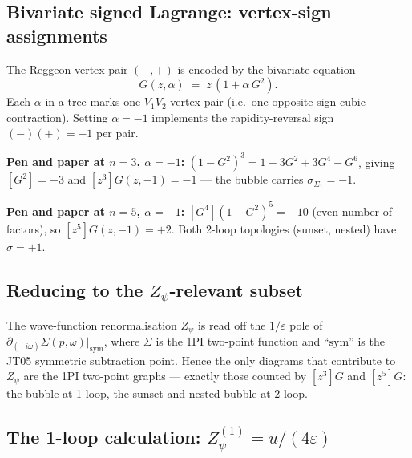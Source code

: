 \documentclass[11pt,a4paper]{article}
\theoremstyle{definition}
\theoremstyle{plain}
\begin{document}
\subsection{Bivariate signed Lagrange: vertex-sign assignments}
\label{app:bivariate-walk}

\begin{cfacbox}
The Reggeon vertex pair $(-,+)$ is encoded by the bivariate equation
\begin{equation}\label{eq:bivariate-walk}
  G(z, \alpha) \;=\; z\,(1 + \alpha\,G^2).
\end{equation}
Each $\alpha$ in a tree marks one $V_1 V_2$ vertex pair (i.e.\ one
opposite-sign cubic contraction).  Setting $\alpha = -1$ implements
the rapidity-reversal sign $(-)(+) = -1$ per pair.

\textbf{Pen and paper at $n = 3$, $\alpha = -1$:}
$(1 - G^2)^3 = 1 - 3 G^2 + 3 G^4 - G^6$,
giving $[G^2] = -3$ and $[z^3]G(z, -1) = -1$ --- the bubble carries
$\sigma_{\Sigma_1} = -1$.

\textbf{Pen and paper at $n = 5$, $\alpha = -1$:}
$[G^4](1 - G^2)^5 = +10$ (even number of factors), so $[z^5]G(z,-1) =
+2$.  Both 2-loop topologies (sunset, nested) have $\sigma = +1$.
\end{cfacbox}

\subsection{Reducing to the $Z_\psi$-relevant subset}\label{app:zpsi-reduce}

\begin{stdbox}
The wave-function renormalisation $Z_\psi$ is read off the
$1/\varepsilon$ pole of $\partial_{(-i\omega)} \Sigma(p, \omega)
\big|_{\mathrm{sym}}$, where $\Sigma$ is the 1PI two-point function
and ``$\mathrm{sym}$'' is the JT05 symmetric subtraction point.
Hence the only diagrams that contribute to $Z_\psi$ are the 1PI
two-point graphs --- exactly those counted by $[z^3]G$ and $[z^5]G$:
the bubble at 1-loop, the sunset and nested bubble at 2-loop.
\end{stdbox}

\subsection{The 1-loop calculation: $Z_\psi^{(1)} = u/(4\varepsilon)$}
\label{app:1loop-walk}
\end{document}
